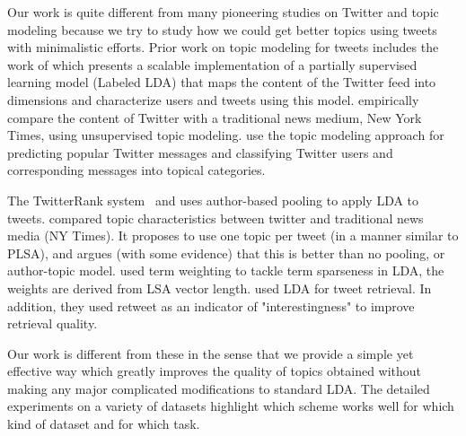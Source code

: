 \documentclass[10pt,a5paper,twoside]{article}
\begin{document}




Our work is quite different from many pioneering studies on Twitter and topic modeling because we try to study how we could get better topics using tweets with minimalistic efforts. Prior work on topic modeling for tweets includes the work of \cite{ramage} which presents a scalable implementation of a partially supervised learning model (Labeled LDA) that maps the content of the Twitter feed into dimensions and characterize users and tweets using this model. \cite{wayne} empirically compare the content of Twitter with a traditional news medium, New York Times, using unsupervised topic modeling. \cite{hong} use the topic modeling approach for predicting popular Twitter messages and classifying Twitter users and corresponding messages into topical categories. 

The {T}witterRank system~\cite{Weng2010wsdm} and \cite{hong} uses author-based pooling to apply LDA to tweets. \cite{Zhao2011ecir} compared topic characteristics between twitter and traditional news media (NY Times). It proposes to use one topic per tweet (in a manner similar to PLSA), and argues (with some evidence) that this is better than no pooling, or author-topic model. \cite{kireyev2009} used term weighting to tackle term sparseness in LDA, the weights are derived from LSA vector length. \cite{Naveed2011cikm} used LDA for tweet retrieval. In addition, they used retweet as an indicator of "interestingness" to improve retrieval quality.

Our work is different from these in the sense that we provide a simple yet effective way which greatly improves the quality of topics obtained without making any major complicated modifications to standard LDA. The detailed experiments on a variety of datasets highlight which scheme works well for which kind of dataset and for which task.
\\
\end{document}
